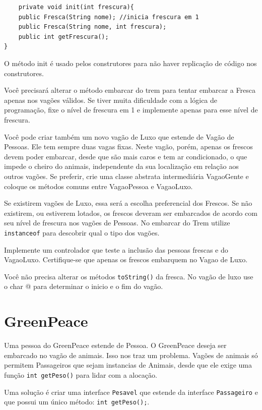 \documentclass[12pt]{article}
\renewcommand{\tt}[1]{\lstinline|#1|}
\begin{document}
\begin{lstlisting}
	private void init(int frescura){
    public Fresca(String nome); //inicia frescura em 1
    public Fresca(String nome, int frescura);
    public int getFrescura();
}
\end{lstlisting}{

O método init é usado pelos construtores para não haver replicação de código nos
construtores.

Você precisará alterar o método embarcar do trem para tentar embarcar a Fresca apenas nos vagões válidos.
Se tiver muita dificuldade com a lógica de programação, fixe o nível de frescura em 1 e implemente apenas
para esse nível de frescura.

Você pode criar também um novo vagão de Luxo que estende de Vagão de Pessoas. Ele tem sempre duas vagas fixas. Neste vagão, porém, apenas os frescos devem poder embarcar, desde que são mais caros e tem ar condicionado, o que impede o cheiro do animais, independente da sua localização em relação aos outros vagões. Se preferir, crie uma classe abstrata intermediária VagaoGente e coloque os métodos comuns entre VagaoPessoa e VagaoLuxo. 

Se existirem vagões de Luxo, essa será a escolha preferencial dos Frescos. Se não existirem, ou estiverem lotados, os frescos
deveram ser embarcados de acordo com seu nível de frescura nos vagões de Pessoas. No embarcar do Trem utilize \tt{instanceof} para descobrir qual
o tipo dos vagões.

Implemente um controlador que teste a inclusão das pessoas frescas e do VagaoLuxo. Certifique-se que apenas os frescos embarquem no Vagao de Luxo.

Você não precisa alterar os métodos \tt{toString()} da fresca. No vagão de luxo use o char @ para determinar o inicio e o fim
do vagão.

\section{GreenPeace}
Uma pessoa do GreenPeace estende de Pessoa. O GreenPeace deseja ser embarcado no vagão de animais. Isso nos traz um problema.
Vagões de animais só permitem Passageiros que sejam instancias de Animais, desde que ele exige uma função \tt{int getPeso()} para lidar com a alocação.

Uma solução é criar uma interface \tt{Pesavel} que estende da interface \tt{Passageiro} e que possui um único método: \tt{int getPeso();}. 

}
\end{document}
